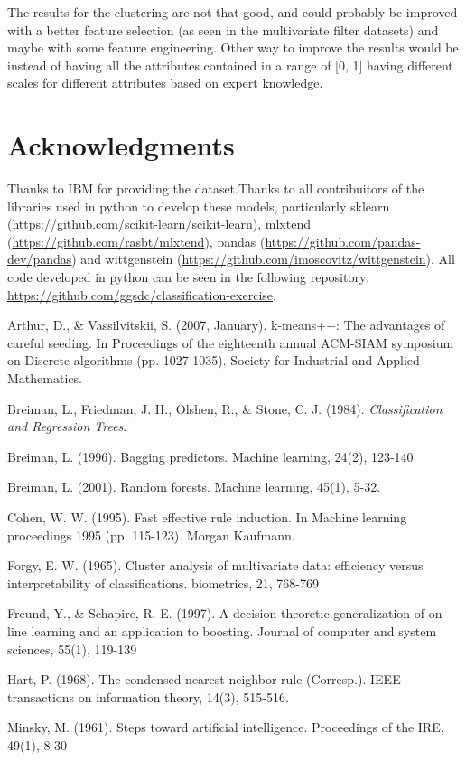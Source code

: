 \documentclass[a4paper,11pt]{article}
\begin{document}
The results for the clustering are not that good, and could probably be improved with a better feature selection (as seen in the multivariate filter datasets) and maybe with some feature engineering. Other way to improve the results would be instead of having all the attributes contained in a range of [0, 1] having different scales for different attributes based on expert knowledge.

\section{Acknowledgments}

Thanks to IBM for providing the dataset.Thanks to all contribuitors of the libraries used in python to develop these models, particularly sklearn (\url{https://github.com/scikit-learn/scikit-learn}), mlxtend (\url{https://github.com/rasbt/mlxtend}), pandas (\url{https://github.com/pandas-dev/pandas}) and wittgenstein (\url{https://github.com/imoscovitz/wittgenstein}).
All code developed in python can be seen in the following repository: \url{https://github.com/ggsdc/classification-exercise}.



\begin{thebibliography}{}

Arthur, D., \& Vassilvitskii, S. (2007, January). k-means++: The advantages of careful seeding. In Proceedings of the eighteenth annual ACM-SIAM symposium on Discrete algorithms (pp. 1027-1035). Society for Industrial and Applied Mathematics.

Breiman, L., Friedman, J. H., Olshen, R., \& Stone, C. J. (1984). \textit{Classification and Regression Trees}.

Breiman, L. (1996). Bagging predictors. Machine learning, 24(2), 123-140

Breiman, L. (2001). Random forests. Machine learning, 45(1), 5-32.

Cohen, W. W. (1995). Fast effective rule induction. In Machine learning proceedings 1995 (pp. 115-123). Morgan Kaufmann.

Forgy, E. W. (1965). Cluster analysis of multivariate data: efficiency versus interpretability of classifications. biometrics, 21, 768-769

Freund, Y., \& Schapire, R. E. (1997). A decision-theoretic generalization of on-line learning and an application to boosting. Journal of computer and system sciences, 55(1), 119-139

Hart, P. (1968). The condensed nearest neighbor rule (Corresp.). IEEE transactions on information theory, 14(3), 515-516.

Minsky, M. (1961). Steps toward artificial intelligence. Proceedings of the IRE, 49(1), 8-30


\end{thebibliography}
\end{document}
